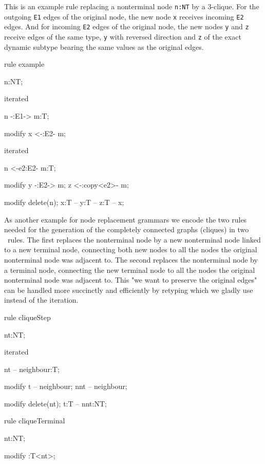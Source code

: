   \begin{example}
This is an example rule replacing a nonterminal node \texttt{n:NT} by a 3-clique.
For the outgoing \texttt{E1} edges of the original node, the new node \texttt{x} receives incoming \texttt{E2} edges.
And for incoming \texttt{E2} edges of the original node, the new nodes \texttt{y} and \texttt{z} receive edges of the same type, \texttt{y} with reversed direction and \texttt{z} of the exact dynamic subtype bearing the same values as the original edges.
    \begin{grgen}
rule example
{
  n:NT;

  iterated {
    n -:E1-> m:T;

    modify {
      x <-:E2- m;
    }
  }

  iterated {
    n <-e2:E2- m:T;

    modify {
      y -:E2-> m;
      z <-:copy<e2>- m;
    }
  }

  modify {
    delete(n);
    x:T -- y:T -- z:T -- x;
  }
}
    \end{grgen}
  \end{example}

As another example for node replacement grammars we encode the two rules needed for the generation of the completely connected graphs (cliques) in two \GrG~rules. The first replaces the nonterminal node by a new nonterminal node linked to a new terminal node, connecting both new nodes to all the nodes the original nonterminal node was adjacent to. The second replaces the nonterminal node by a terminal node, connecting the new terminal node to all the nodes the original nonterminal node was adjacent to. This "we want to preserve the original edges" can be handled more succinctly and efficiently by retyping which we gladly use instead of the iteration.

  \begin{example}
    \begin{grgen}
rule cliqueStep
{
  nt:NT;

  iterated {
    nt -- neighbour:T;

    modify {
      t -- neighbour;
      nnt -- neighbour;
    }
  }

  modify {
    delete(nt);
    t:T -- nnt:NT;
  }
}

rule cliqueTerminal
{
  nt:NT;

  modify {
    :T<nt>;
  }
}
    \end{grgen}
  \end{example}

